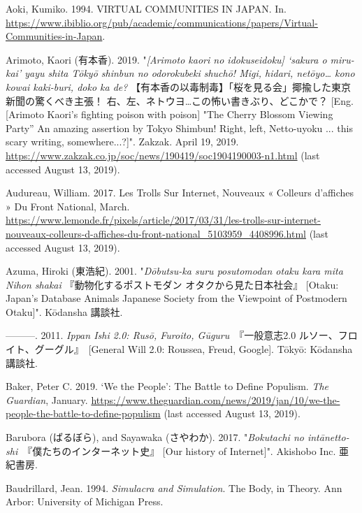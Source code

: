 \documentclass[10pt,british,A4paper,oneside]{memoir}
\begin{document}
\hypertarget{ref-aoki_virtual_1994}{}
Aoki, Kumiko. 1994. VIRTUAL COMMUNITIES IN JAPAN. In.
\url{https://www.ibiblio.org/pub/academic/communications/papers/Virtual-Communities-in-Japan}.

\hypertarget{ref-arimoto_eng._2019}{}
Arimoto, Kaori (有本香). 2019. "\emph{[Arimoto kaori no idokuseidoku] `sakura o miru-kai' yayu shita Tōkyō shinbun no odorokubeki shuchō! Migi, hidari, netōyo… kono kowai kaki-buri, doko ka de?} 【有本香の以毒制毒】「桜を見る会」揶揄した東京新聞の驚くべき主張！ 右、左、ネトウヨ…この怖い書きぶり、どこかで？ [Eng. [Arimoto Kaori's fighting poison with poison] "The Cherry Blossom Viewing Party” An amazing assertion by Tokyo Shimbun! Right, left, Netto-uyoku ... this scary writing, somewhere...?]". Zakzak. April 19, 2019.
\url{https://www.zakzak.co.jp/soc/news/190419/soc1904190003-n1.html} (last accessed August 13, 2019).

\hypertarget{ref-audureau_les_2017}{}
Audureau, William. 2017. Les Trolls Sur Internet, Nouveaux « Colleurs
d'affiches » Du Front National, March.
\url{https://www.lemonde.fr/pixels/article/2017/03/31/les-trolls-sur-internet-nouveaux-colleurs-d-affiches-du-front-national_5103959_4408996.html} (last accessed August 13, 2019).

\hypertarget{ref-azuma_otaku:_2001}{}
Azuma, Hiroki (東浩紀). 2001. "\emph{Dōbutsu-ka suru posutomodan otaku kara mita Nihon shakai} 『動物化するポストモダン オタクから見た日本社会』 [Otaku: Japan's Database Animals Japanese Society from the Viewpoint of Postmodern Otaku]". Kōdansha 講談社.

\hypertarget{ref-azuma_ippan_2011}{}
---------. 2011. \emph{Ippan Ishi 2.0: Rusō, Furoito, Gūguru}　『一般意志2.0 ルソー、フロイト、グーグル』　[General Will 2.0: Roussea, Freud, Google]. Tōkyō:
Kōdansha 講談社.

\hypertarget{ref-baker_we_2019}{}
Baker, Peter C. 2019. `We the People': The Battle to Define Populism.
\emph{The Guardian}, January.
\url{https://www.theguardian.com/news/2019/jan/10/we-the-people-the-battle-to-define-populism} (last accessed August 13, 2019).

\hypertarget{ref-barubora_eng:_2017}{}
Barubora (ばるぼら), and Sayawaka (さやわか). 2017. "\emph{Bokutachi no intānetto-shi}　『僕たちのインターネット史』 [Our history of Internet]".
Akishobo Inc. 亜紀書房.

\hypertarget{ref-baudrillard_simulacra_1994}{}
Baudrillard, Jean. 1994. \emph{Simulacra and Simulation}. The Body, in
Theory. Ann Arbor: University of Michigan Press.
\end{document}
